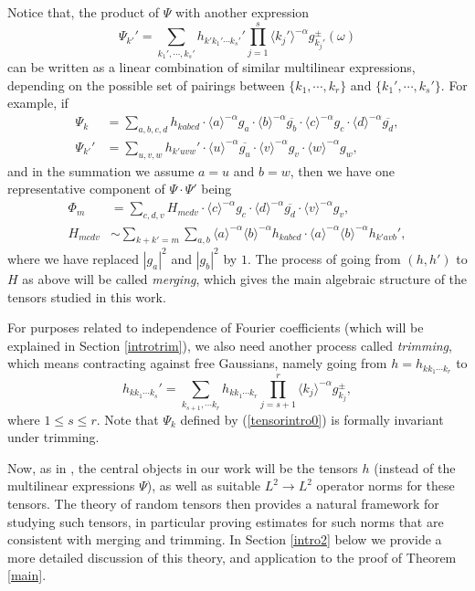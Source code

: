 \documentclass[11 pt,reqno]{amsart}
\theoremstyle{definition}
\theoremstyle{remark}
\numberwithin{equation}{section}
\begin{document}
Notice that, the product of $\Psi$ with another expression
 \[\Psi_{k'}'=\sum_{k_1',\cdots,k_s'}h_{k'k_1'\cdots k_s'}'\prod_{j=1}^s\langle k_j'\rangle^{-\alpha}g_{k_j'}^\pm(\omega)\] can be written as a linear combination of similar multilinear expressions, depending on the possible set of pairings between $\{k_1,\cdots,k_r\}$ and $\{k_1',\cdots,k_s'\}$. For example, if  \[\begin{aligned}\Psi_k&=\sum_{a,b,c,d}h_{kabcd}\cdot 
 \langle a\rangle^{-\alpha}g_a\cdot \langle b\rangle^{-\alpha}\overline{g_b}\cdot\langle c\rangle^{-\alpha}g_c\cdot\langle d\rangle^{-\alpha}\overline{g_d},\\
 \Psi_{k'}'&=\sum_{u,v,w}h_{k'uvw}'\cdot\langle  u\rangle^{-\alpha}\overline{g_u}\cdot\langle v\rangle^{-\alpha}g_v\cdot\langle w\rangle^{-\alpha}g_w,
 \end{aligned}\]
 and in the summation we assume $a=u$ and $b=w$, then we have one representative component of $\Psi\cdot\Psi'$ being
 \begin{equation}\label{examplemerge0}\begin{aligned}\Phi_m&=\sum_{c,d,v}H_{mcdv}\cdot \langle c\rangle^{-\alpha}g_c\cdot\langle d\rangle^{-\alpha}\overline{g_d}\cdot\langle v\rangle^{-\alpha}g_v,\\
 H_{mcdv}&\sim\sum_{k+k'=m}\sum_{a,b}\langle a\rangle^{-\alpha}\langle b\rangle^{-\alpha}h_{kabcd}\cdot\langle a\rangle^{-\alpha}\langle b\rangle^{-\alpha}h_{k'avb}',
 \end{aligned}\end{equation} where we have replaced $|g_a|^2$ and $|g_b|^2$ by $1$. The process of going from $(h,h')$ to $H$ as above will be called \emph{merging}, which gives the main algebraic structure of the tensors studied in this work.
 
 For purposes related to independence of Fourier coefficients (which will be explained in Section \ref{introtrim}), we also need another process called \emph{trimming}, which means contracting against free Gaussians, namely going from $h=h_{kk_1\cdots k_r}$ to
 \[h_{kk_1\cdots k_s}'=\sum_{k_{s+1},\cdots k_r}h_{kk_1\cdots k_r}\prod_{j=s+1}^r\langle k_j\rangle^{-\alpha}g_{k_j}^{\pm},\] where $1\leq s\leq r$. Note that $\Psi_k$ defined by (\ref{tensorintro0}) is formally invariant under trimming.
 
 Now, as in \cite{DNY}, the central objects in our work will be the tensors $h$ (instead of the multilinear expressions $\Psi$), as well as suitable $L^2\to L^2$ operator norms for these tensors. The theory of random tensors then provides a natural framework for studying such tensors, in particular proving estimates for such norms that are consistent with merging and trimming. In Section \ref{intro2} below we provide a more detailed discussion of this theory, and application to the proof of Theorem \ref{main}.
\end{document}

